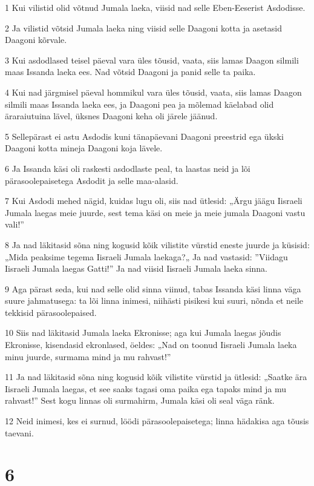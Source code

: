 \par 1 Kui vilistid olid võtnud Jumala laeka, viisid nad selle Eben-Eeserist Asdodisse.
\par 2 Ja vilistid võtsid Jumala laeka ning viisid selle Daagoni kotta ja asetasid Daagoni kõrvale.
\par 3 Kui asdodlased teisel päeval vara üles tõusid, vaata, siis lamas Daagon silmili maas Issanda laeka ees. Nad võtsid Daagoni ja panid selle ta paika.
\par 4 Kui nad järgmisel päeval hommikul vara üles tõusid, vaata, siis lamas Daagon silmili maas Issanda laeka ees, ja Daagoni pea ja mõlemad käelabad olid äraraiutuina lävel, üksnes Daagoni keha oli järele jäänud.
\par 5 Sellepärast ei astu Asdodis kuni tänapäevani Daagoni preestrid ega ükski Daagoni kotta mineja Daagoni koja lävele.
\par 6 Ja Issanda käsi oli raskesti asdodlaste peal, ta laastas neid ja lõi pärasoolepaisetega Asdodit ja selle maa-alasid.
\par 7 Kui Asdodi mehed nägid, kuidas lugu oli, siis nad ütlesid: „Ärgu jäägu Iisraeli Jumala laegas meie juurde, sest tema käsi on meie ja meie jumala Daagoni vastu vali!”
\par 8 Ja nad läkitasid sõna ning kogusid kõik vilistite vürstid eneste juurde ja küsisid: „Mida peaksime tegema Iisraeli Jumala laekaga?„ Ja nad vastasid: ”Viidagu Iisraeli Jumala laegas Gatti!” Ja nad viisid Iisraeli Jumala laeka sinna.
\par 9 Aga pärast seda, kui nad selle olid sinna viinud, tabas Issanda käsi linna väga suure jahmatusega: ta lõi linna inimesi, niihästi pisikesi kui suuri, nõnda et neile tekkisid pärasoolepaised.
\par 10 Siis nad läkitasid Jumala laeka Ekronisse; aga kui Jumala laegas jõudis Ekronisse, kisendasid ekronlased, öeldes: „Nad on toonud Iisraeli Jumala laeka minu juurde, surmama mind ja mu rahvast!”
\par 11 Ja nad läkitasid sõna ning kogusid kõik vilistite vürstid ja ütlesid: „Saatke ära Iisraeli Jumala laegas, et see saaks tagasi oma paika ega tapaks mind ja mu rahvast!” Sest kogu linnas oli surmahirm, Jumala käsi oli seal väga ränk.
\par 12 Neid inimesi, kes ei surnud, löödi pärasoolepaisetega; linna hädakisa aga tõusis taevani.

\chapter{6}

